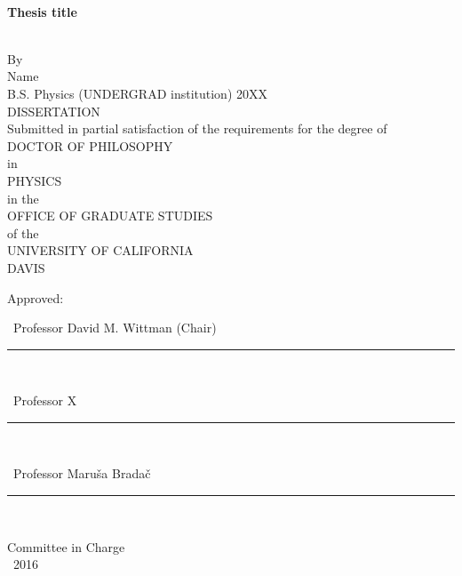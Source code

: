 \singlespacing

~\vspace{-0.75in} %
\begin{center}

  \begin{large}
    {\bf Thesis title}
  \end{large}\\\n
  By\\\n
  {\sc Name}\\
  B.S. Physics (UNDERGRAD institution) 20XX\\
  DISSERTATION\\\n
  Submitted in partial satisfaction of the requirements for the degree of\\\n
  DOCTOR OF PHILOSOPHY\\\n
  in\\\n
  PHYSICS\\\n
  in the\\\n
  OFFICE OF GRADUATE STUDIES\\\n
  of the\\\n
  UNIVERSITY OF CALIFORNIA\\\n
  DAVIS\\\n\n
  
  Approved:\\\n\n
  
  ~Professor David M. Wittman (Chair)\\
  \rule{4in}{1pt}\\\n\n  

  ~Professor X\\
  \rule{4in}{1pt}\\\n\n  

  ~Professor Maru{\v s}a Brada{\v c}\\
  \rule{4in}{1pt}\\

  \vfill
  
  Committee in Charge\\
  ~2016
  
\end{center}
